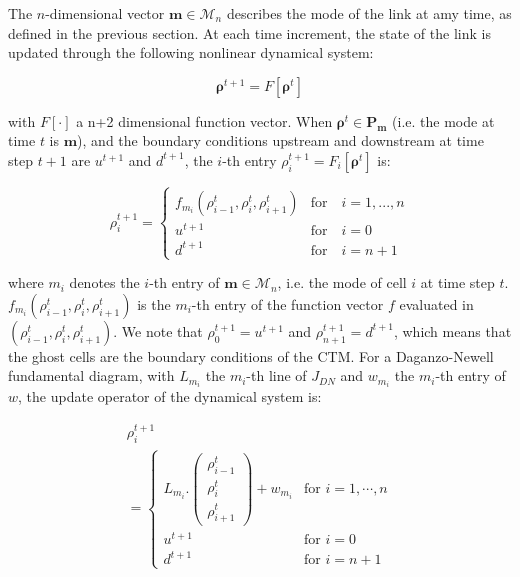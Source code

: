\hspace{10mm}

The $n$-dimensional vector $\boldsymbol m\in\mathcal{M}_{n}$ describes the mode of the link at amy time, as defined in the previous section. At each time increment, the state of the link is updated through the following nonlinear dynamical system:

\begin{equation}
\boldsymbol\rho^{t+1} = F[\boldsymbol\rho^{t}]
\label{eq:underlyingSystem1}
\end{equation}

\noindent with $F[\cdot]$ a n+2 dimensional function vector. When $\boldsymbol\rho^{t}\in \boldsymbol P_{\boldsymbol m}$ (i.e. the mode at time $t$ is $\boldsymbol m$), and the boundary conditions upstream and downstream at time step $t+1$ are $u^{t+1}$ and $d^{t+1}$, the $i$-th entry $\rho^{t+1}_{i}=F_{i}[\boldsymbol\rho^{t}]$ is:

\begin{equation}
\rho^{t+1}_{i} = \begin{cases}
f_{m_{i}}(\rho^{t}_{i-1},\rho^{t}_{i},\rho^{t}_{i+1}) & \text{for}\quad i=1,...,n\\
u^{t+1} & \text{for}\quad i=0\\
d^{t+1} & \text{for}\quad i=n+1
\end{cases}
\label{eq:underlyingSystem2}
\end{equation}

\noindent where $m_{i}$ denotes the $i$-th entry of $\boldsymbol m \in\mathcal{M}_{n}$, i.e. the mode of cell $i$ at time step $t$. $f_{m_{i}}(\rho^{t}_{i-1},\rho^{t}_{i},\rho^{t}_{i+1})$ is the $m_{i}$-th entry of the function vector $f$ evaluated in $(\rho^{t}_{i-1},\rho^{t}_{i},\rho^{t}_{i+1})$. We note that $\rho^{t+1}_{0}=u^{t+1}$ and $\rho^{t+1}_{n+1}=d^{t+1}$, which means that the ghost cells are the boundary conditions of the CTM. For a Daganzo-Newell fundamental diagram, with $L_{m_{i}}$ the $m_{i}$-th line of $J_{DN}$ and $w_{m_{i}}$ the $m_{i}$-th entry of $w$, the update operator of the dynamical system is:

\begin{equation}
\begin{array}{l}
\rho^{t+1}_{i}\\
= \begin{cases}
L_{m_{i}}.\left( \begin{array}{c}
\rho^{t}_{i-1}\\
\rho^{t}_{i}\\
\rho^{t}_{i+1}
\end{array} \right)
+ w_{m_{i}} & \text{for }i=1,\cdots,n\\
u^{t+1} & \text{for }i=0\\
d^{t+1} & \text{for }i=n+1
\end{cases}
\end{array}
\label{eq:underlyingSystemDN}
\end{equation}

